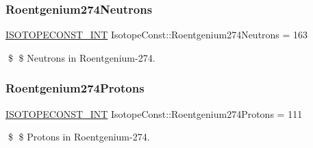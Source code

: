 \subsubsection{\texorpdfstring{Roentgenium274\+Neutrons}{Roentgenium274Neutrons}}
{\footnotesize\ttfamily \mbox{\hyperlink{group___isotope_const-_macros_ga5f18360b3e99483a35c32d789e62621c}{I\+S\+O\+T\+O\+P\+E\+C\+O\+N\+S\+T\+\_\+\+I\+NT}} Isotope\+Const\+::\+Roentgenium274\+Neutrons = 163}

\$ \$ Neutrons in Roentgenium-\/274. \mbox{\label{group___isotope_const-_roentgenium-_rg274_ga9d57aaff17daa8549e8b44de03f0e5af}} 
\subsubsection{\texorpdfstring{Roentgenium274\+Protons}{Roentgenium274Protons}}
{\footnotesize\ttfamily \mbox{\hyperlink{group___isotope_const-_macros_ga5f18360b3e99483a35c32d789e62621c}{I\+S\+O\+T\+O\+P\+E\+C\+O\+N\+S\+T\+\_\+\+I\+NT}} Isotope\+Const\+::\+Roentgenium274\+Protons = 111}

\$ \$ Protons in Roentgenium-\/274. 